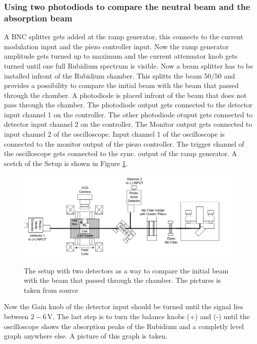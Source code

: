 \subsubsection{Using two photodiods to compare the neutral beam and the absorption beam}
\label{sec:absorptionsspectrum}
A BNC splitter gets added at the ramp generator, this connects to the current modulation input and the piezo controller input.
Now the ramp generator amplitude gets turned up to maximum and the current attenuator knob gets turned until one full Rubidium spectrum is visible.
Now a beam splitter has to be installed infront of the Rubidium chamber.
This splitts the beam $50/50$ and provides a possibility to compare the initial beam with the beam that passed through the chamber.
A photodiode is placed infront of the beam that does not pass through the chamber.
The photodiode output gets connected to the detector input channel 1 on the controller.
The other photodiode otuput gets connected to detector input channel 2 on the controller.
The Monitor output gets connected to input channel 2 of the oscilloscope.
Input channel 1 of the oscilloscope is connected to the monitor output of the piezo controller.
The trigger channel of the oscilloscope gets connected to the sync. output of the ramp generator.
A scetch of the Setup is shown in Figure \ref{fig:setup}.

\begin{figure}
    \centering
    \caption{The setup with two detectors as a way to compare the initial beam with the beam that passed through the chamber. The pictures is taken from source \cite[16]{anleitung_exp}}
    \includegraphics[width=\textwidth]{content/data/setup}
    \label{fig:setup}
\end{figure}

Now the Gain knob of the detector input should be turned until the signal lies between $2-6 \,\si{\volt}$.
The last step is to turn the balance knobs (+) and (-) until the oscilloscope shows the absorption peaks of the Rubidium and a completly level graph anywhere else.
A picture of this graph is taken.